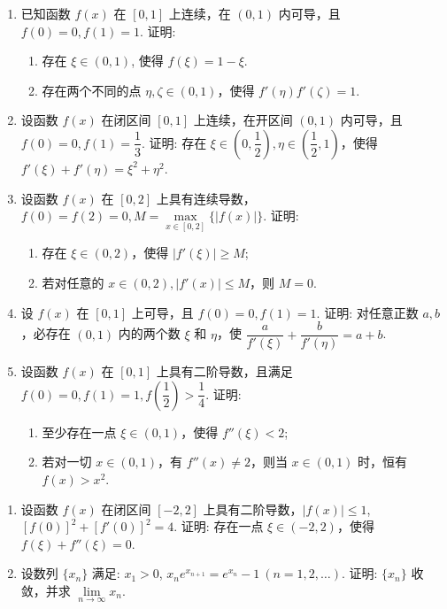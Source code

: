 \newpage

\begin{enumerate}[label=\textbf{\arabic*.}, itemsep=6cm, resume]

    \item 已知函数 $f(x)$ 在 $[0,1]$ 上连续，在 $(0,1)$ 内可导，且 $f(0) = 0, f(1) = 1$. 证明:
    \begin{enumerate}[label=(\arabic*)]
        \item 存在 $\xi \in (0,1)$, 使得 $f(\xi) = 1 - \xi$.
        \item 存在两个不同的点 $\eta, \zeta \in (0,1)$，使得 $f'(\eta)f'(\zeta) = 1$.
    \end{enumerate}

    \item 设函数 $f(x)$ 在闭区间 $[0,1]$ 上连续，在开区间 $(0,1)$ 内可导，且 $f(0) = 0, f(1) = \dfrac{1}{3}$. 证明: 存在 $\xi \in \left(0,\dfrac{1}{2}\right), \eta \in \left(\dfrac{1}{2},1\right)$，使得 $f'(\xi) + f'(\eta) = \xi^2 + \eta^2$.
    
    \item 设函数 $f(x)$ 在 $[0,2]$ 上具有连续导数，$f(0) = f(2) = 0, M = \max\limits_{x \in [0,2]} \{|f(x)|\}$. 证明:
    \begin{enumerate}[label=(\arabic*)]
        \item 存在 $\xi \in (0,2)$，使得 $|f'(\xi)| \ge M$;
        \item 若对任意的 $x \in (0,2), |f'(x)| \le M$，则 $M = 0$.
    \end{enumerate}
    
    \item 设 $f(x)$ 在 $[0,1]$ 上可导，且 $f(0) = 0, f(1) = 1$. 证明: 对任意正数 $a,b$，必存在 $(0,1)$ 内的两个数 $\xi$ 和 $\eta$，使 $\dfrac{a}{f'(\xi)} + \dfrac{b}{f'(\eta)} = a + b$.
    
    \item 设函数 $f(x)$ 在 $[0,1]$ 上具有二阶导数，且满足 $f(0) = 0, f(1) = 1, f\left(\dfrac{1}{2}\right) > \dfrac{1}{4}$. 证明:
    \begin{enumerate}[label=(\arabic*)]
        \item 至少存在一点 $\xi \in (0,1)$，使得 $f''(\xi) < 2$;
        \item 若对一切 $x \in (0,1)$，有 $f''(x) \ne 2$，则当 $x \in (0,1)$ 时，恒有 $f(x) > x^2$.
    \end{enumerate}
\end{enumerate}

\newpage

\begin{enumerate}[label=\textbf{\arabic*.}, itemsep=6cm, resume]
    \item 设函数 $f(x)$ 在闭区间 $[-2,2]$ 上具有二阶导数，$|f(x)| \le 1$, $[f(0)]^2 + [f'(0)]^2 = 4$. 证明: 存在一点 $\xi \in (-2,2)$，使得 $f(\xi) + f''(\xi) = 0$.
    
    \item 设数列 $\{x_n\}$ 满足: $x_1 > 0$, $x_n e^{x_{n+1}} = e^{x_n} - 1 \ (n=1,2,\dots)$. 证明: $\{x_n\}$ 收敛，并求 $\lim\limits_{n \to \infty} x_n$.
\end{enumerate}

